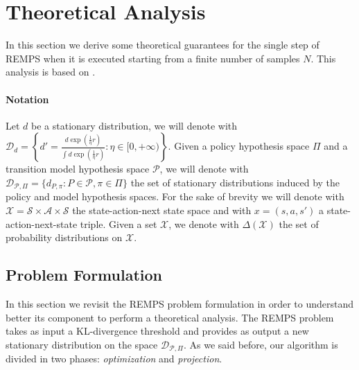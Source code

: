 %

\section{Theoretical Analysis}\label{sec:remps-theory}
In this section we derive some theoretical guarantees for the single step of REMPS when it is executed starting from a finite number of samples $N$. This analysis is based on \citep{cortes2010}.
\paragraph{Notation}
Let $d$ be a stationary distribution, we will denote with \newline $\mathcal{D}_d = \left\{d'=\frac{d \exp \left( \frac{1}{\eta}r \right)}{\int d \exp \left( \frac{1}{\eta}r \right)}: \eta \in [0,+\infty) \right\}$. Given a policy hypothesis space $\Pi$ and a transition model hypothesis space $\mathcal{P}$, we will denote with $\mathcal{D}_{\mathcal{P}, \Pi} = \{ d_{P,\pi} : P \in \mathcal{P}, \pi \in \Pi \}$ the set of stationary distributions induced by the policy and model hypothesis spaces.
For the sake of brevity we will denote with $\mathcal{X} = \mathcal{S} \times \mathcal{A} \times \mathcal{S}$ the state-action-next state space and with $x = (s, a, s')$ a state-action-next-state triple. Given a set $\mathcal{X}$, we denote with $\Delta(\mathcal{X})$ the set of probability distributions on $\mathcal{X}$.

\subsection{Problem Formulation}
In this section we revisit the REMPS problem formulation in order to understand better its component to perform a theoretical analysis.
The REMPS problem takes as input a KL-divergence threshold and provides as output a new stationary distribution on the space $\mathcal{D}_{\mathcal{P},\Pi}$.
As we said before, our algorithm is divided in two phases: \textit{optimization} and \textit{projection}.
